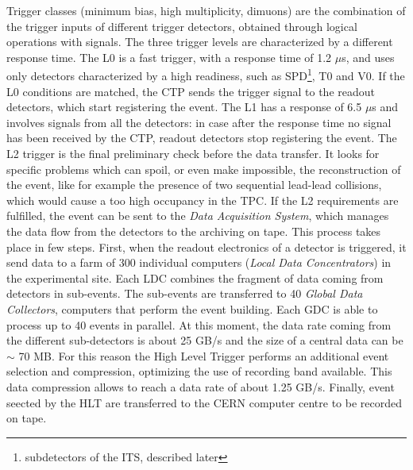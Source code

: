 Trigger classes (minimum bias, high multiplicity, dimuons) are the combination of the trigger inputs of different trigger detectors, obtained through logical operations with signals. The three trigger levels are characterized by a different response time. The L0 is a fast trigger, with a response time of 1.2 $\mu$s, and uses only detectors characterized by a high readiness, such as SPD\footnote{subdetectors of the ITS, described later}, T0 and V0. If the L0 conditions are matched, the CTP sends the trigger signal to the readout detectors, which start registering the event. The L1 has a response of 6.5 $\mu$s and involves signals from all the detectors: in case after the response time no signal has been received by the CTP, readout detectors stop registering the event. The L2 trigger is the final preliminary check before the data transfer. It looks for specific problems which can spoil, or even make impossible, the reconstruction of the event, like for example the presence of two sequential lead-lead collisions, which would cause a too high occupancy in the TPC. If the L2 requirements are fulfilled, the event can be sent to the \textit{Data Acquisition System}, which manages the data flow from the detectors to the archiving on tape. This process takes place in few steps. First, when the readout electronics of a detector is triggered, it send data to a farm of 300 individual computers (\textit{Local Data Concentrators}) in the experimental site. Each LDC combines the fragment of data coming from detectors in sub-events. The sub-events are transferred to 40 \textit{Global Data Collectors}, computers that perform the event building. Each GDC is able to process up to 40 events in parallel. At this moment, the data rate coming from the different sub-detectors is about 25 GB/s and the size of a central data can be $\sim$ 70 MB. For this reason the High Level Trigger performs an additional event selection and compression, optimizing the use of recording band available. This data compression allows to reach a data rate of about 1.25 GB/s. Finally, event seected by the HLT are transferred to the CERN computer centre to be recorded on tape.
